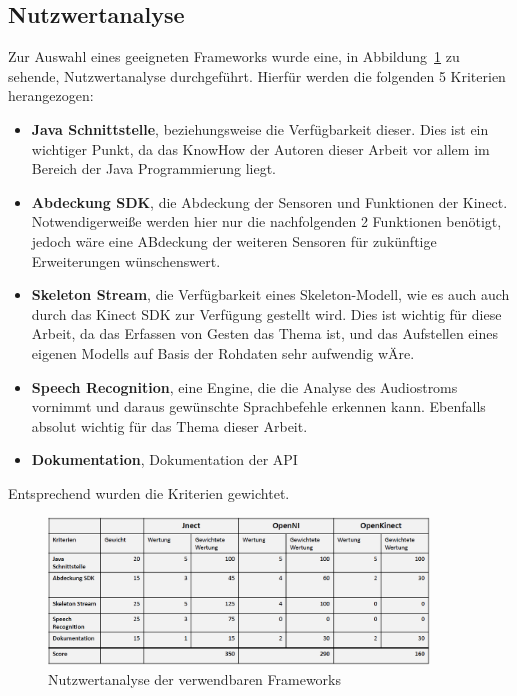 \subsection{Nutzwertanalyse}

Zur Auswahl eines geeigneten Frameworks wurde eine, in Abbildung~\ref{fig:nutzwert} zu sehende, Nutzwertanalyse durchgef\"uhrt. 
Hierf\"ur werden die folgenden 5 Kriterien herangezogen:
\begin{itemize}
  \item \textbf{Java Schnittstelle}, beziehungsweise die Verf\"ugbarkeit dieser. Dies ist ein wichtiger Punkt, da das KnowHow der Autoren dieser Arbeit vor allem im Bereich der Java Programmierung liegt.
  \item \textbf{Abdeckung SDK}, die Abdeckung der Sensoren und Funktionen der Kinect. Notwendigerwei\ss e werden hier nur die nachfolgenden 2 Funktionen ben\"otigt, jedoch w\"are eine ABdeckung der weiteren Sensoren f\"ur zuk\"unftige Erweiterungen w\"unschenswert.
  \item \textbf{Skeleton Stream}, die Verf\"ugbarkeit eines Skeleton-Modell, wie es auch auch durch das Kinect SDK zur Verf\"ugung gestellt wird. Dies ist wichtig f\"ur diese Arbeit, da das Erfassen von Gesten das Thema ist, und das Aufstellen eines eigenen Modells auf Basis der Rohdaten sehr aufwendig w\"Are.
  \item \textbf{Speech Recognition}, eine Engine, die die Analyse des Audiostroms vornimmt und daraus gew\"unschte Sprachbefehle erkennen kann. Ebenfalls absolut wichtig f\"ur das Thema dieser Arbeit.
  \item \textbf{Dokumentation}, Dokumentation der API
\end{itemize}
Entsprechend wurden die Kriterien gewichtet.
\begin{figure}[htb]
\centering
\includegraphics[width=0.9\textwidth]{img/04kapitel/nutzwert.png}
\caption[Nutzwertanalyse Frameworks]{Nutzwertanalyse der verwendbaren Frameworks}
\label{fig:nutzwert}
\end{figure}


